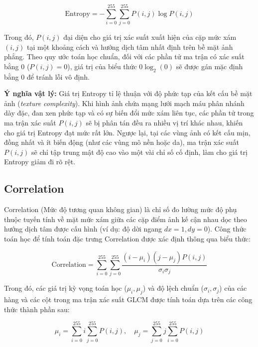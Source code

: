 \begin{equation}
    \text{Entropy} = - \sum_{i=0}^{255} \sum_{j=0}^{255} P(i, j) \log P(i, j)
    \label{eq:glcm_entropy}
\end{equation}

Trong đó, $P(i, j)$ đại diện cho giá trị xác suất xuất hiện của cặp mức xám $(i, j)$ tại một khoảng cách và hướng dịch tâm nhất định trên bề mặt ảnh phẳng. Theo quy ước toán học chuẩn, đối với các phần tử ma trận có xác suất bằng 0 ($P(i, j) = 0$), giá trị của biểu thức $0 \log_{2}(0)$ sẽ được gán mặc định bằng 0 để tránh lỗi vô định.

\textbf{Ý nghĩa vật lý:} Giá trị Entropy tỉ lệ thuận với độ phức tạp của kết cấu bề mặt ảnh (\textit{texture complexity}). Khi hình ảnh chứa mạng lưới mạch máu phân nhánh dày đặc, đan xen phức tạp và có sự biến đổi mức xám liên tục, các phần tử trong ma trận xác suất $P(i, j)$ sẽ bị phân tán đều ra nhiều vị trí khác nhau, khiến cho giá trị Entropy đạt mức rất lớn. Ngược lại, tại các vùng ảnh có kết cấu mịn, đồng nhất và ít biến động (như các vùng mô nền hoặc da), ma trận xác suất $P(i, j)$ sẽ chỉ tập trung mật độ cao vào một vài chỉ số cố định, làm cho giá trị Entropy giảm đi rõ rệt.

\subsection{Correlation}

Correlation (Mức độ tương quan không gian) là chỉ số đo lường mức độ phụ thuộc tuyến tính về mặt mức xám giữa các cặp điểm ảnh kế cận nhau dọc theo hướng dịch tâm được cấu hình (ví dụ: độ dời ngang $dx = 1, dy = 0$). Công thức toán học để tính toán đặc trưng Correlation được xác định thông qua biểu thức:

\begin{equation}
    \text{Correlation} = \sum_{i=0}^{255} \sum_{j=0}^{255} \frac{(i - \mu_i)(j - \mu_j)P(i, j)}{\sigma_i \sigma_j}
    \label{eq:glcm_correlation}
\end{equation}

Trong đó, các giá trị kỳ vọng toán học ($\mu_i, \mu_j$) và độ lệch chuẩn ($\sigma_i, \sigma_j$) của các hàng và các cột trong ma trận xác suất GLCM được tính toán dựa trên các công thức thành phần sau:

\begin{equation}
    \mu_i = \sum_{i=0}^{255} i \sum_{j=0}^{255} P(i, j), \quad \mu_j = \sum_{j=0}^{255} j \sum_{i=0}^{255} P(i, j)
\end{equation}

